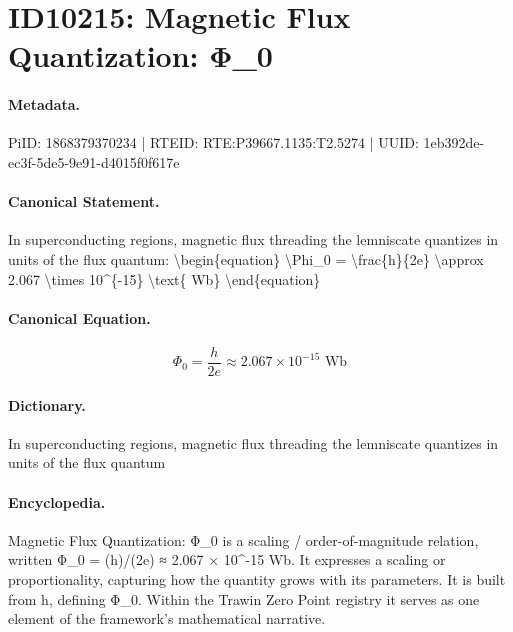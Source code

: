 \section*{ID10215: Magnetic Flux Quantization: Φ\_0}
\paragraph{Metadata.}
PiID: 1868379370234 | RTEID: RTE:P39667.1135:T2.5274 | UUID: 1eb392de-ec3f-5de5-9e91-d4015f0f617e

\paragraph{Canonical Statement.}
In superconducting regions, magnetic flux threading the lemniscate quantizes in units of the flux quantum: \textbackslash{}begin\{equation\} \textbackslash{}Phi\_0 = \textbackslash{}frac\{h\}\{2e\} \textbackslash{}approx 2.067 \textbackslash{}times 10\textasciicircum{}\{-15\} \textbackslash{}text\{ Wb\} \textbackslash{}end\{equation\}

\paragraph{Canonical Equation.}
\[
\Phi_0 = \frac{h}{2e} \approx 2.067 \times 10^{-15} \text{ Wb}
\]

\paragraph{Dictionary.}
In superconducting regions, magnetic flux threading the lemniscate quantizes in units of the flux quantum

\paragraph{Encyclopedia.}
Magnetic Flux Quantization: Φ\_0 is a scaling / order-of-magnitude relation, written Φ\_0 = (h)/(2e) ≈ 2.067 × 10\textasciicircum{}-15 Wb. It expresses a scaling or proportionality, capturing how the quantity grows with its parameters. It is built from h, defining Φ\_0. Within the Trawin Zero Point registry it serves as one element of the framework's mathematical narrative.
